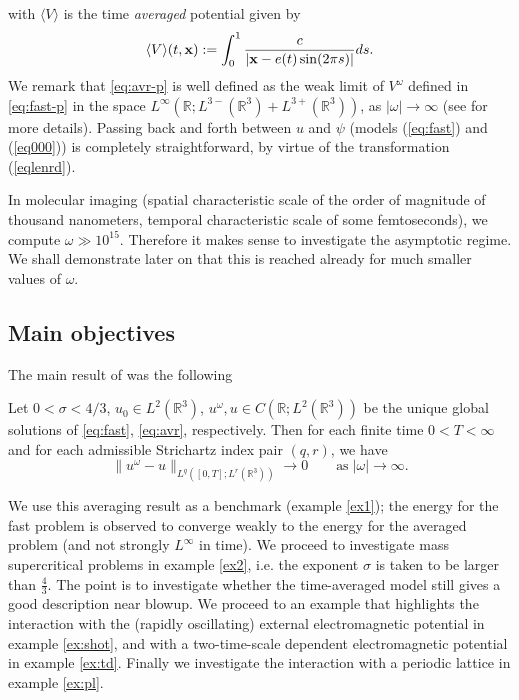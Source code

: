 \documentclass[10pt, leqno]{amsart}
\newcommand{\R}{\mathbb{R}}
\newcommand{\xb}{\boldsymbol{\rm{x}}}
\begin{document}
with $\langle V\rangle$ is the time \emph{averaged} potential given by
\begin{equation}\label{eq:avr-p}
\langle V\rangle(t, \xb):=\int_0^1\frac{c}{|\xb-e(t)\sin(2\pi s)|}ds.
\end{equation}
We remark that \eqref{eq:avr-p} is well defined as the weak limit of $V^\omega$ defined in \eqref{eq:fast-p}
in the space $L^\infty(\R;L^{3-}(\R^3)+L^{3+}(\R^3))$, as $|\omega|\to\infty$ (see \cite{xfel1} for more details).
Passing back and forth between $u$ and $\psi$ (models (\ref{eq:fast}) and (\ref{eq000})) is completely straightforward, by virtue of the transformation (\ref{eqlenrd}).
\begin{remark}
In molecular imaging (spatial characteristic scale of the order of magnitude of thousand nanometers, temporal characteristic scale of some femtoseconds), we compute
$\omega\gg10^{15}$. Therefore it makes sense to investigate the asymptotic regime. We shall demonstrate later on that this is reached already for much smaller values of $\omega$.
\end{remark}

\subsection{Main objectives}

The main result of \cite{xfel1} was the following

\begin{theorem}
Let $0<\sigma<4/3$, $u_0\in L^2(\R^3)$, $u^\omega, u\in C(\R; L^2(\R^3))$ be the unique global solutions of
\eqref{eq:fast}, \eqref{eq:avr}, respectively. Then
for each finite time $0<T<\infty$ and for each admissible Strichartz index pair $(q, r)$, we have
\begin{equation*}
\|u^\omega-u\|_{L^q([0, T]; L^r(\R^3))}\to0\qquad\textrm{as}\;|\omega|\to\infty.
\end{equation*}
\end{theorem}

We use this averaging result as a benchmark (example \ref{ex1}); the energy for the fast problem is observed to converge weakly to the energy for the
averaged problem (and not strongly $L^\infty$ in time). We proceed to investigate mass supercritical problems in example \ref{ex2}, i.e. the exponent $\sigma$ is taken to be larger than $\frac{4}3$. The point is to investigate whether the time-averaged model still gives a good description near blowup. We proceed to an example that highlights the interaction with the (rapidly oscillating) external electromagnetic potential in example \ref{ex:shot}, and with a two-time-scale dependent electromagnetic potential in example \ref{ex:td}. Finally we investigate the interaction with a periodic lattice in example \ref{ex:pl}.
\end{document}
